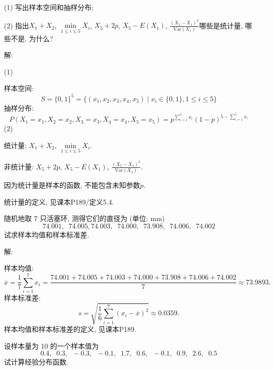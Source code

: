 \documentclass[standard]{ExBook}
\renewenvironment{shaded}{%
  \def\FrameCommand{\fboxsep=\FrameSep \colorbox{shadecolor}}%
  \MakeFramed{\advance\hsize-\width \FrameRestore}%
}{%
  \endMakeFramed
}
\begin{document}
\begin{qitems}
\begin{bbox}
\begin{shaded}
(1) 写出样本空间和抽样分布;

(2) 指出$X_1+X_2$, $\min\limits_{1 \leq i \leq 5}X_i$, $X_5+2p$, $X_5-E(X_1)$, $\displaystyle\frac{(X_5-X_1)^2}{\text{Var}(X_1)}$哪些是统计量, 哪些不是. 为什么?
    \end{shaded}
    \end{bbox}

\vspace{\dimexpr2.5cm-5em\relax}

解: 

(1)

样本空间:
$$
S = \{0, 1\}^5 = \{(x_1, x_2, x_3, x_4, x_5) \mid x_i \in \{0, 1\}, 1 \leq i \leq 5\}
$$
抽样分布:
$$
P(X_1=x_1, X_2=x_2, X_3=x_3, X_4=x_4, X_5=x_5) = p^{\sum_{i=1}^{5} x_i} (1-p)^{5 - \sum_{i=1}^{5} x_i}
$$
(2)

统计量: $X_1+X_2$, $\min\limits_{1 \leq i \leq 5}X_i$.

非统计量: $X_5+2p$, $X_5-E(X_1)$, $\displaystyle\frac{(X_5-X_1)^2}{\text{Var}(X_1)}$.

因为统计量是样本的函数, 不能包含未知参数$p$.

\textcolor{themeColor}{\selectfont {} 统计量的定义, 见课本P189/定义5.4.}

\vspace{2.5cm-5em}

    \begin{bbox}
    \begin{shaded}
        \qitem
随机地取 7 只活塞环, 测得它们的直径为 (单位: mm)
$$74.001, \;\; 74.005, 74.003, \;\; 74.000, \;\; 73.908, \;\; 74.006, \;\; 74.002$$
试求样本均值和样本标准差.
    \end{shaded}
    \end{bbox}

\vspace{\dimexpr2.5cm-5em\relax}

解:

样本均值:
$$
\overline{x}=\frac{1}{7}\sum\limits_{i=1}^{7}x_i=\frac{74.001+74.005+74.003+74.000+73.908+74.006+74.002}{7}\approx73.9893.
$$
样本标准差:
$$
s=\sqrt{\frac{1}{6}\sum\limits_{i=1}^{7}(x_i-\overline{x})^2}\approx0.0359.
$$
\textcolor{themeColor}{\selectfont {} 样本均值和样本标准差的定义, 见课本P189.}

\vspace{2.5cm-5em}

    \begin{bbox}
    \begin{shaded}
        \qitem
设样本量为 10 的一个样本值为
$$0.4, \;\; 0.3, \;\; -0.3, \;\; -0.1, \;\; 1.7, \;\; 0.6, \;\; -0.1, \;\; 0.9, \;\; 2.6, \;\; 0.5$$
试计算经验分布函数.
    \end{shaded}
    \end{bbox}


\end{qitems}
\end{document}
